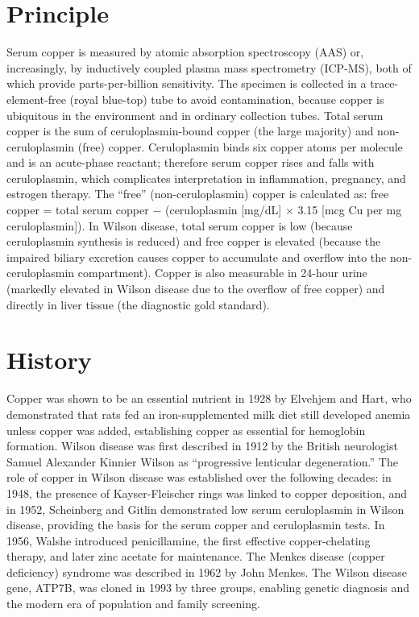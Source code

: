 \section*{Principle}
Serum copper is measured by atomic absorption spectroscopy (AAS) or, increasingly, by inductively coupled plasma mass spectrometry (ICP-MS), both of which provide parts-per-billion sensitivity. The specimen is collected in a trace-element-free (royal blue-top) tube to avoid contamination, because copper is ubiquitous in the environment and in ordinary collection tubes. Total serum copper is the sum of ceruloplasmin-bound copper (the large majority) and non-ceruloplasmin (free) copper. Ceruloplasmin binds six copper atoms per molecule and is an acute-phase reactant; therefore serum copper rises and falls with ceruloplasmin, which complicates interpretation in inflammation, pregnancy, and estrogen therapy. The ``free'' (non-ceruloplasmin) copper is calculated as: free copper = total serum copper $-$ (ceruloplasmin [mg/dL] $\times$ 3.15 [mcg Cu per mg ceruloplasmin]). In Wilson disease, total serum copper is low (because ceruloplasmin synthesis is reduced) and free copper is elevated (because the impaired biliary excretion causes copper to accumulate and overflow into the non-ceruloplasmin compartment). Copper is also measurable in 24-hour urine (markedly elevated in Wilson disease due to the overflow of free copper) and directly in liver tissue (the diagnostic gold standard).

\section*{History}
Copper was shown to be an essential nutrient in 1928 by Elvehjem and Hart, who demonstrated that rats fed an iron-supplemented milk diet still developed anemia unless copper was added, establishing copper as essential for hemoglobin formation. Wilson disease was first described in 1912 by the British neurologist Samuel Alexander Kinnier Wilson as ``progressive lenticular degeneration.'' The role of copper in Wilson disease was established over the following decades: in 1948, the presence of Kayser-Fleischer rings was linked to copper deposition, and in 1952, Scheinberg and Gitlin demonstrated low serum ceruloplasmin in Wilson disease, providing the basis for the serum copper and ceruloplasmin tests. In 1956, Walshe introduced penicillamine, the first effective copper-chelating therapy, and later zinc acetate for maintenance. The Menkes disease (copper deficiency) syndrome was described in 1962 by John Menkes. The Wilson disease gene, ATP7B, was cloned in 1993 by three groups, enabling genetic diagnosis and the modern era of population and family screening.

